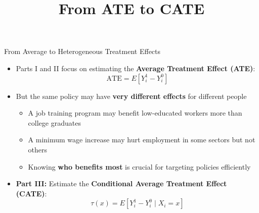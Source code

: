 \documentclass[hyperref={pdfpagelabels=false}]{beamer}
\begin{document}
\begin{frame}{From Average to Heterogeneous Treatment Effects}
	\begin{itemize}
		\item Parts I and II focus on estimating the \textbf{Average Treatment Effect (ATE)}:
		\begin{equation*}
			\text{ATE} = E[Y^{1}_{i} - Y^{0}_{i}]
		\end{equation*}

		\vspace{0.2cm}
		\item But the same policy may have \textbf{very different effects} for different people
		\vspace{0.2cm}
		\begin{itemize}
			\item A job training program may benefit low-educated workers more than college graduates
			\vspace{0.2cm}
			\item A minimum wage increase may hurt employment in some sectors but not others
			\vspace{0.2cm}
			\item Knowing \textbf{who benefits most} is crucial for targeting policies efficiently
		\end{itemize}
		\vspace{0.3cm}
		\item \textbf{Part III:} Estimate the \textbf{Conditional Average Treatment Effect (CATE)}:
		\begin{equation*}
			\tau(x) = E[Y^{1}_{i} - Y^{0}_{i} \mid X_{i} = x]
		\end{equation*}
	\end{itemize}
\end{frame}




\title[]
{From ATE to CATE}

\author{}
\institute{}
\date{}

\begin{frame}{}
	\titlepage
\end{frame}
\end{document}
